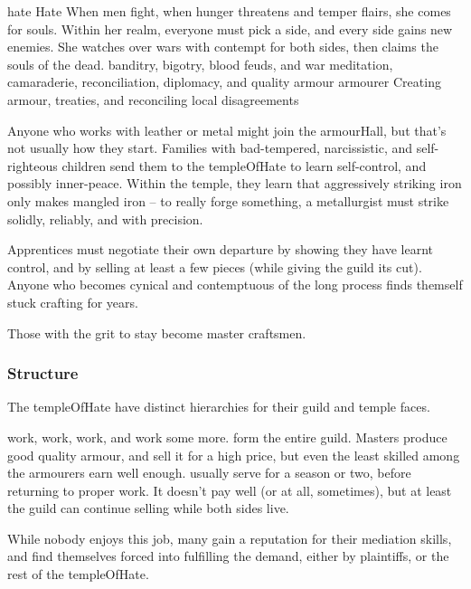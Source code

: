 \begin{multicols}{2}
  {\gls{hate}}%
  {Hate}%
  {When men fight, when hunger threatens and temper flairs, she comes for souls.
  Within her realm, everyone must pick a side, and every side gains new enemies.
  She watches over wars with contempt for both sides, then claims the souls of the dead.}%
  {banditry, bigotry, blood feuds, and war}%
  {meditation, camaraderie, reconciliation, diplomacy, and quality armour}%
  {\Gls{armourer}}%
  {Creating armour, treaties, and reconciling local disagreements}%

Anyone who works with leather or metal might join the \gls{armourHall}, but that's not usually how they start.
Families with bad-tempered, narcissistic, and self-righteous children send them to the \gls{templeOfHate} to learn self-control, and possibly inner-peace.
Within the temple, they learn that aggressively striking iron only makes mangled iron -- to really forge something, a metallurgist must strike solidly, reliably, and with precision.

Apprentices must negotiate their own departure by showing they have learnt control, and by selling at least a few pieces (while giving the guild its cut).
Anyone who becomes cynical and contemptuous of the long process finds themself stuck crafting for years.

Those with the grit to stay become master craftsmen.

\subsubsection{Structure}
The \gls{templeOfHate} have distinct hierarchies for their guild and temple faces.

\begin{description}
  work, work, work, and work some more.
  form the entire guild.
  Masters produce good quality armour, and sell it for a high price, but even the least skilled among the armourers earn well enough.
  usually serve for a season or two, before returning to proper work.
  It doesn't pay well (or at all, sometimes), but at least the guild can continue selling while both sides live.

  While nobody enjoys this job, many gain a reputation for their mediation skills, and find themselves forced into fulfilling the demand, either by plaintiffs, or the rest of the \gls{templeOfHate}.
\end{description}


\end{multicols}
